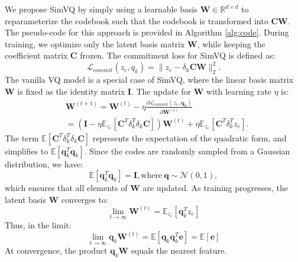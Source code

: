 We propose SimVQ by simply using a learnable basis $\bm{W}\in \mathbb{R}^{d\times d}$ to reparameterize the codebook such that the codebook %
is transformed into $\bm{C}\bm{W}$. The pseudo-code for this approach is provided in Algorithm \ref{alg:code}. During training, we optimize only the latent basis matrix $\bm{W}$, while keeping the coefficient matrix $\bm{C}$ frozen. The commitment loss for SimVQ is defined as:
\begin{equation}
    \mathcal{L}_{commit}(z_e,q_k)=\|z_e-\delta_k\bm{C}\bm{W}\|^2_2.
\end{equation}
The vanilla VQ model is a special case of SimVQ, where the linear basis matrix $\bm{W}$ is fixed as the identity matrix $\bm{I}$. The update for $\bm{W}$ with learning rate $\eta$ is:
\begin{align}
    &\bm{W}^{(t+1)} = \bm{W}^{(t)} - \eta \frac{\partial \mathcal{L}_{commit}(z_e,\bm{q}_k)}{\partial \bm{W}^{(t)}}\\ &= (\bm{I}-\eta \mathbb{E}_{z_e} \left[ \bm{C}^T\delta_k^T\delta_k\bm{C}\right])\bm{W}^{(t)} + \eta \mathbb{E}_{z_e} \left[ \bm{C}^T\delta_k^{T}z_e\right].
\end{align}
The term $\mathbb{E} \left[\bm{C}^T \delta_k^T \delta_k \bm{C}\right]$ represents the expectation of the quadratic form, and simplifies to $\mathbb{E}[\bm{q}_k^T \bm{q}_k]$. Since the codes are randomly sampled from a Gaussian distribution, we have:%
\begin{equation}
    \mathbb{E}\left[\bm{q}_k^T\bm{q}_k\right]=\bm{I}, \text{where}~\bm{q}\sim \mathcal{N}(0,1),
\end{equation}
which ensures that all elements of $\bm{W}$ are updated. As training progresses, the latent basis $\bm{W}$ converges to: \begin{equation}
    \lim_{t\rightarrow \infty}\bm{W}^{(t)} = \mathbb{E}_{z_e} \left[\bm{q}_k^T z_e\right]
\end{equation}
Thus, in the limit:
\begin{equation}
    \lim_{t\rightarrow \infty} \bm{q}_k \bm{W}^{(t)}=\mathbb{E}\left[\bm{q}_k\bm{q}_k^T\bm{e}\right]=\mathbb{E}\left[\bm{e}\right]
\end{equation}
At convergence, the product $\bm{q}_k \bm{W}$ equals the nearest feature. 



